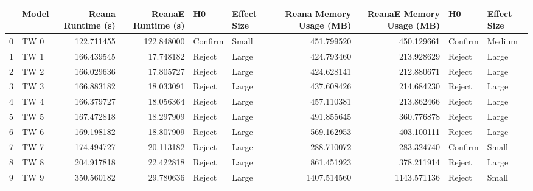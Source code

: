 \begin{tabular}{llrrllrrll}
\toprule
{} & Model &  Reana Runtime (s) &  ReanaE Runtime (s) &       H0 & Effect Size &  Reana Memory Usage (MB) &  ReanaE Memory Usage (MB) &       H0 & Effect Size \\
\midrule
0 &  TW 0 &         122.711455 &          122.848000 &  Confirm &       Small &               451.799520 &                450.129661 &  Confirm &      Medium \\
1 &  TW 1 &         166.439545 &           17.748182 &   Reject &       Large &               424.793460 &                213.928629 &   Reject &       Large \\
2 &  TW 2 &         166.029636 &           17.805727 &   Reject &       Large &               424.628141 &                212.880671 &   Reject &       Large \\
3 &  TW 3 &         166.883182 &           18.033091 &   Reject &       Large &               437.608426 &                214.684230 &   Reject &       Large \\
4 &  TW 4 &         166.379727 &           18.056364 &   Reject &       Large &               457.110381 &                213.862466 &   Reject &       Large \\
5 &  TW 5 &         167.472818 &           18.297909 &   Reject &       Large &               491.855645 &                360.776878 &   Reject &       Large \\
6 &  TW 6 &         169.198182 &           18.807909 &   Reject &       Large &               569.162953 &                403.100111 &   Reject &       Large \\
7 &  TW 7 &         174.494727 &           20.113182 &   Reject &       Large &               288.710072 &                283.324740 &  Confirm &       Small \\
8 &  TW 8 &         204.917818 &           22.422818 &   Reject &       Large &               861.451923 &                378.211914 &   Reject &       Large \\
9 &  TW 9 &         350.560182 &           29.780636 &   Reject &       Large &              1407.514560 &               1143.571136 &   Reject &       Small \\
\bottomrule
\end{tabular}

